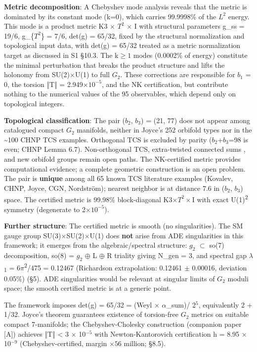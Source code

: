 \documentclass[11pt,a4paper]{article}
\begin{document}
\textbf{Metric decomposition}: A Chebyshev mode analysis reveals that
the metric is dominated by its constant mode (k=0), which carries
99.9998\% of the \(L^{2}\) energy. This mode is a product metric K3
\(\times\) \(T^{2}\) \(\times\) I with structural parameters g\_ss =
19/6, g\_\{\(T^{2}\)\} = 7/6, det(g) = 65/32, fixed by the structural
normalization and topological input data, with det(g) = 65/32 treated as
a metric normalization target as discussed in S1 §10.3. The k\(\geq 1\)
modes (0.0002\% of energy) constitute the minimal perturbation that
breaks the product structure and lifts the holonomy from
SU(2)\(\times\)U(1) to full \(G_{2}\). These corrections are responsible
for \(b_{1}\) = 0, the torsion ‖T‖ = 2.949\(\times 10^{-5}\), and the NK
certification, but contribute nothing to the numerical values of the
95 observables, which depend only on topological integers.

\textbf{Topological classification}: The pair (\(b_{2}\), \(b_{3}\)) =
(21, 77) does not appear among catalogued compact \(G_{2}\)
manifolds, neither in Joyce's 252 orbifold types nor in the
\textasciitilde100 CHNP TCS examples. Orthogonal TCS is excluded by
parity (\(b_{2}\)+\(b_{3}\)=98 is even; CHNP Lemma 6.7). Non-orthogonal
TCS, extra-twisted connected sums \cite{20}, and new orbifold groups
remain open paths. The NK-certified metric provides computational
evidence; a complete geometric construction is an open problem. The pair
is \textbf{unique} among all 65 known TCS literature examples (Kovalev,
CHNP, Joyce, CGN, Nordström); nearest neighbor is at distance 7.6 in
(\(b_{2}\), \(b_{3}\)) space. The certified metric is 99.98\%
block-diagonal K3\(\times T^{2} \times\)I with exact
U(1)\textsuperscript{2} symmetry (degenerate to 2\(\times 10^{-5}\)).

\textbf{Further structure}: The certified metric is smooth (no
singularities). The SM gauge group SU(3)\(\times\)SU(2)\(\times\)U(1)
does \textbf{not} arise from ADE singularities in this framework; it
emerges from the algebraic/spectral structure: \(g_{2}\) \(\subset\)
so(7) decomposition, so(8) = \(g_{2}\) \(\oplus\) L \(\oplus\) R
triality giving N\_gen = 3, and spectral gap
\(\lambda\)\textsubscript{1} = 6\(\pi\)\textsuperscript{2}/475 = 0.12467
(Richardson extrapolation: 0.12461 \(\pm\) 0.00016, deviation 0.05\%)
(§5). ADE singularities would be relevant at singular limits of
\(G_{2}\) moduli space; the smooth certified metric is at a generic
point.

The framework imposes det(g) = 65/32 = (Weyl \(\times\)
\(\alpha\)\_sum)/ 2\(^{5}\), equivalently 2 + 1/32. Joyce's theorem
\cite{20} guarantees existence of torsion-free \(G_{2}\) metrics on
suitable compact 7-manifolds; the Chebyshev-Cholesky construction
(companion paper [A]) achieves ‖T‖ \textless{} 3 \(\times\)
10\(^{-5}\) with Newton-Kantorovich certification h = 8.95 \(\times\)
10\(^{-9}\) (Chebyshev-certified, margin \(\times 56\) million; §8.5).
\end{document}
